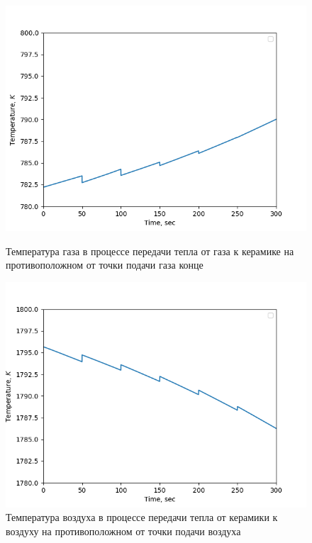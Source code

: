 \documentclass[a4paper,11pt,numreferences,mathsec,kaplist]{isuepsutf8}
\begin{document}
\begin{article}
\begin{figure}[ht]
    \centering
    \begin{minipage}[t]{0.23\textwidth}
        \centering
        \includegraphics[width=\textwidth]{img1}
        \caption {Температура газа в процессе передачи тепла от газа к
        керамике на противоположном от точки подачи газа конце}
        \label{fig:img1}
    \end{minipage}
    \hfill
    \begin{minipage}[t]{0.23\textwidth}
        \centering
        \includegraphics[width=\textwidth]{img2}
        \caption {Температура воздуха в процессе передачи тепла от
        керамики к воздуху на противоположном от точки подачи воздуха
}
\end{minipage}
\end{figure}
\end{article}
\end{document}
